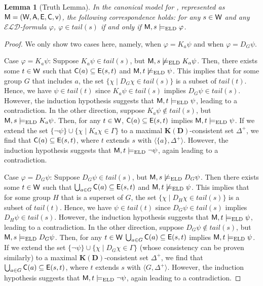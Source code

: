 \documentclass{article}
\newtheorem{lemma}[theorem]{Lemma}%
\newcommand{\CA}{\textnormal{\sf A}\xspace}
\newcommand{\CC}{\textnormal{\sf C}\xspace}
\newcommand{\CE}{\textnormal{\sf E}\xspace}
\newcommand{\CM}{\textnormal{\sf M}\xspace}
\newcommand{\CV}{\textnormal{\sf v}\xspace}
\newcommand{\CW}{\textnormal{\sf W}\xspace}
\renewcommand{\phi}{\varphi}
\newcommand{\langd}{\ensuremath{\mathcal{ELD}}\xspace}
\newcommand{\ld}{\text{\normalfont ELD}\xspace}
\newcommand{\KD}{\ensuremath{\mathbf{K(D)}}\xspace}
\begin{document}
\begin{lemma}[Truth Lemma]
\label{lem:truth-eld}
In the canonical model for \ld, represented as $\CM = (\CW,\CA,\CE,\CC,\CV)$, the following correspondence holds: for any $s \in \CW$ and any \langd-formula $\phi$, $\phi \in tail(s)$ if and only if $\CM,s \models_{\ld} \phi$.
\end{lemma}
\begin{proof}
We only show two cases here, namely, when $\phi = K_a\psi$ and when $\phi = D_G\psi$.

Case $\phi = K_a \psi$:
%
Suppose $K_a\psi\in tail(s)$, but $\CM,s\not\models_\ld K_a\psi$. Then, there exists some $t\in \CW$ such that $\CC(a)\subseteq \CE (s,t)$ and $\CM,t\not\models_\ld \psi$. This implies that for some group $G$ that includes $a$, the set $\{\chi\mid D_G\chi\in tail(s)\}$ is a subset of $tail(t)$. 
Hence, we have $\psi\in tail(t)$ since $K_a\psi \in tail(s)$ implies $D_G\psi \in tail(s)$. However, the induction hypothesis suggests that $\CM,t\models_\ld \psi$, leading to a contradiction.
%
In the other direction, suppose $K_a\psi \notin tail(s)$, but $\CM,s\models_\ld K_a\psi$. Then, for any $t\in \CW$, $\CC(a)\subseteq \CE (s,t)$ implies $\CM,t\models_\ld \psi$. If we extend the set $\{\neg\psi\}\cup\{\chi\mid K_a\chi\in\Gamma\}$ to a maximal \KD-consistent set $\Delta^+$, we find that $\CC(a)\subseteq \CE(s,t)$, where $t$ extends $s$ with $\langle\{a\},\Delta^+\rangle$. However, the induction hypothesis suggests that $\CM,t\models_\ld \neg\psi$, again leading to a contradiction.

Case $\phi = D_G\psi$:
%
Suppose $D_G\psi\in tail(s)$, but $\CM,s\not\models_\ld D_G\psi$. Then there exists some $t\in \CW$ such that $\bigcup_{a\in G}\CC(a)\subseteq \CE (s,t)$ and $\CM,t\not\models_\ld \psi$. This implies that for some group $H$ that is a superset of $G$, the set $\{\chi\mid D_H\chi\in tail(s)\}$ is a subset of $tail(t)$. Hence, we have $\psi \in tail(t)$ since $D_G\psi\in tail(s)$ implies $D_H\psi\in tail(s)$. However, the induction hypothesis suggests that $\CM,t\models_\ld \psi$, leading to a contradiction.
%
In the other direction, suppose $D_G\psi \notin tail(s)$, but $\CM,s\models_\ld D_G\psi$. Then, for any $t\in \CW$ $\bigcup_{a\in G}\CC(a)\subseteq \CE (s,t)$ implies $\CM,t\models_\ld \psi$. If we extend the set $\{\neg\psi\}\cup\{\chi\mid D_G\chi\in\Gamma\}$ (whose consistency can be proven similarly) to a maximal \KD-consistent set $\Delta^+$, we find that $\bigcup_{a\in G}\CC(a)\subseteq \CE(s,t)$, where $t$ extends $s$ with $\langle G,\Delta^+\rangle$. However, the induction hypothesis suggests that $\CM,t\models_\ld \neg\psi$, again leading to a contradiction.
\end{proof}
\end{document}
